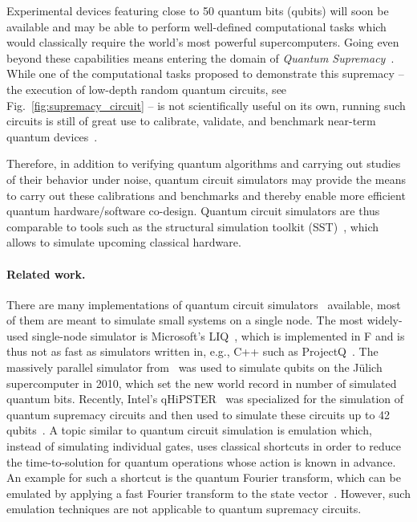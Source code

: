 \documentclass[sigconf]{acmart}
\begin{document}
Experimental devices featuring close to 50 quantum bits (qubits) will soon be available and may be able to perform well-defined computational tasks which would classically require the world's most powerful supercomputers. Going even beyond these capabilities means entering the domain of \textit{Quantum Supremacy}~\cite{boixo2016characterizing,aaronson2016}. While one of the computational tasks proposed to demonstrate this supremacy -- the execution of low-depth random quantum circuits, see Fig.~\ref{fig:supremacy_circuit} -- is not scientifically useful on its own, running such circuits is still of great use to calibrate, validate, and benchmark near-term quantum devices~\cite{boixo2016characterizing}.

Therefore, in addition to verifying quantum algorithms and carrying out studies of their behavior under noise, quantum circuit simulators may provide the means to carry out these calibrations and benchmarks and thereby enable more efficient quantum hardware/software co-design. Quantum circuit simulators are thus comparable to tools such as the structural simulation toolkit (SST)~\cite{rodrigues2011structural}, which allows to simulate upcoming classical hardware.

\paragraph{Related work.} There are many implementations of quantum circuit simulators~\cite{qclist} available, most of them are meant to simulate small systems on a single node. The most widely-used single-node simulator is Microsoft's LIQ~\cite{wecker14}, which is implemented in F and is thus not as fast as simulators written in, e.g., C++ such as ProjectQ~\cite{steiger2016projectq}. The massively parallel simulator from~\cite{trieu2009large,de2007massively} was used to simulate  qubits on the J\"ulich supercomputer in 2010, which set the new world record in number of simulated quantum bits. Recently, Intel's qHiPSTER~\cite{smelyanskiy2016qhipster} was specialized for the simulation of quantum supremacy circuits and then used to simulate these circuits up to 42 qubits~\cite{boixo2016characterizing}.
A topic similar to quantum circuit simulation is emulation which, instead of simulating individual gates, uses classical shortcuts in order to reduce the time-to-solution for quantum operations whose action is known in advance. An example for such a shortcut is the quantum Fourier transform, which can be emulated by applying a fast Fourier transform to the state vector~\cite{haner2016high}. However, such emulation techniques are not applicable to quantum supremacy circuits.
\end{document}
